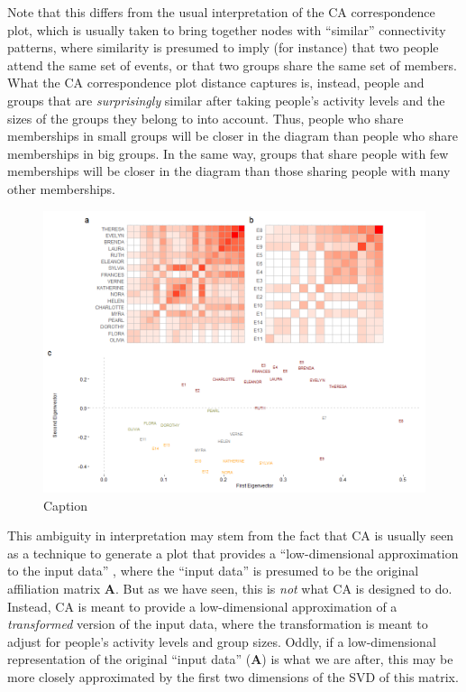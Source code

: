 \documentclass[a4paper,fleqn]{cas-sc}
\begin{document}
Note that this differs from the usual interpretation of the CA correspondence plot, which is usually taken to bring together nodes with ``similar'' connectivity patterns, where similarity is presumed to imply (for instance) that two people attend the same set of events, or that two groups share the same set of members. What the CA correspondence plot distance captures is, instead, people and groups that are \textit{surprisingly} similar after taking people's activity levels and the sizes of the groups they belong to into account. Thus, people who share memberships in small groups will be closer in the diagram than people who share memberships in big groups. In the same way, groups that share people with few memberships will be closer in the diagram than those sharing people with many other memberships. 

\begin{figure}
    \centering
    \includegraphics[width=1.0\textwidth]{Plots/bon-sim.png}
    \caption{Caption}
    \label{fig:bon-sim}
\end{figure}

This ambiguity in interpretation may stem from the fact that CA is usually seen as a technique to generate a plot that provides a ``low-dimensional approximation to the input data'' \citep[125]{faust2005using}, where the ``input data'' is presumed to be the original affiliation matrix $\mathbf{A}$. But as we have seen, this is \textit{not} what CA is designed to do. Instead, CA is meant to provide a low-dimensional approximation of a \textit{transformed} version of the input data, where the transformation is meant to adjust for people's activity levels and group sizes. Oddly, if a low-dimensional representation of the original ``input data'' ($\mathbf{A}$) is what we are after, this may be more closely approximated by the first two dimensions of the SVD of this matrix. 
\end{document}
